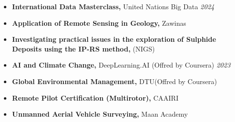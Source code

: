\documentclass[letterpaper,11pt]{article}
\begin{document}
	\begin{itemize}[left=0pt, label={}, topsep=7.5pt, partopsep=0pt, itemsep=6pt, parsep=0pt]
		\item \textbf{International Data Masterclass,} United Nations Big Data  \hfill \textit{2024}
	\end{itemize}
	\vspace{-1.2em} 
	\begin{itemize}[left=0pt, label={}, topsep=7.5pt, partopsep=0pt, itemsep=6pt, parsep=0pt]
		\item \textbf{Application of Remote Sensing in Geology,} Zawinas
	\end{itemize}
	\vspace{-1.2em}
	\begin{itemize}[left=0pt, label={}, topsep=7.5pt, partopsep=0pt, itemsep=6pt, parsep=0pt]
		\item \textbf{Investigating practical issues in the exploration of Sulphide Deposits using the IP-RS method,} (NIGS)\footnotemark[1]
	\end{itemize}
	\vspace{-1.2em}
	\begin{itemize}[left=0pt, label={}, topsep=7.5pt, partopsep=0pt, itemsep=6pt, parsep=0pt]
		\item \textbf{AI and Climate Change,} DeepLearning.AI (Offred by Coursera)  \hfill \textit{2023}
	\end{itemize}
	\vspace{-1.2em}
	\begin{itemize}[left=0pt, label={}, topsep=7.5pt, partopsep=0pt, itemsep=6pt, parsep=0pt]
		\item \textbf{Global Environmental Management,} DTU\footnotemark[2] (Offred by Coursera)  \hfill \textit{}
	\end{itemize}
	\vspace{-1.2em}
	\begin{itemize}[left=0pt, label={}, topsep=7.5pt, partopsep=0pt, itemsep=6pt, parsep=0pt]
		\item \textbf{Remote Pilot Certification (Multirotor),} CAAIRI\footnotemark[3] \hfill \textit{}
	\end{itemize}
	\vspace{-1.2em}
	\begin{itemize}[left=0pt, label={}, topsep=7.5pt, partopsep=0pt, itemsep=6pt, parsep=0pt]
		\item \textbf{Unmanned Aerial Vehicle Surveying,} Maan Academy  \hfill \textit{}
	\end{itemize}
\end{document}
